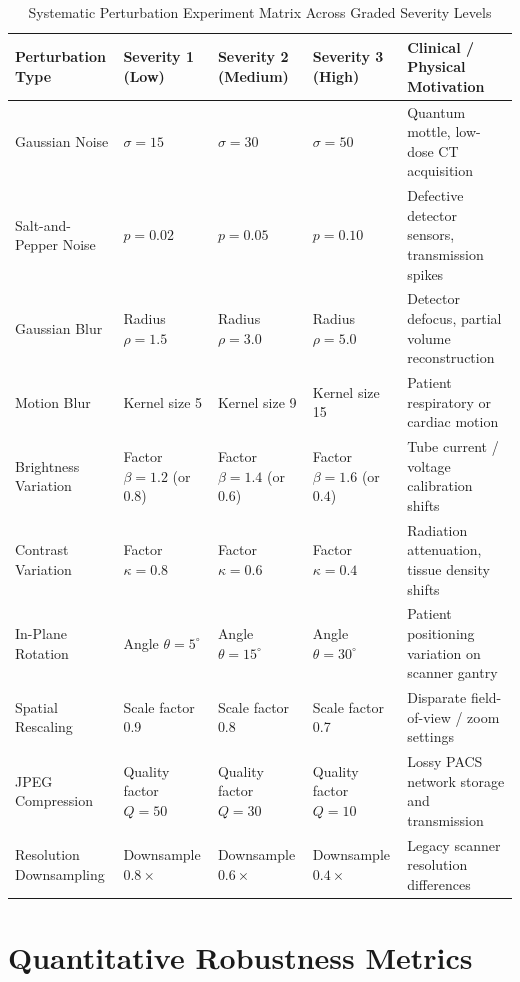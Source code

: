 \documentclass[conference]{IEEEtran}
\begin{document}
\begin{table}[t]
\caption{Systematic Perturbation Experiment Matrix Across Graded Severity Levels}
\label{tab:perturbation_matrix}
\centering
\begin{tabular}{lp{3.5cm}p{3.5cm}p{3.5cm}p{3.5cm}}
\toprule
\textbf{Perturbation Type} & \textbf{Severity 1 (Low)} & \textbf{Severity 2 (Medium)} & \textbf{Severity 3 (High)} & \textbf{Clinical / Physical Motivation} \\
\midrule
Gaussian Noise & $\sigma = 15$ & $\sigma = 30$ & $\sigma = 50$ & Quantum mottle, low-dose CT acquisition \\
Salt-and-Pepper Noise & $p = 0.02$ & $p = 0.05$ & $p = 0.10$ & Defective detector sensors, transmission spikes \\
Gaussian Blur & Radius $\rho = 1.5$ & Radius $\rho = 3.0$ & Radius $\rho = 5.0$ & Detector defocus, partial volume reconstruction \\
Motion Blur & Kernel size 5 & Kernel size 9 & Kernel size 15 & Patient respiratory or cardiac motion \\
Brightness Variation & Factor $\beta = 1.2$ (or $0.8$) & Factor $\beta = 1.4$ (or $0.6$) & Factor $\beta = 1.6$ (or $0.4$) & Tube current / voltage calibration shifts \\
Contrast Variation & Factor $\kappa = 0.8$ & Factor $\kappa = 0.6$ & Factor $\kappa = 0.4$ & Radiation attenuation, tissue density shifts \\
In-Plane Rotation & Angle $\theta = 5^\circ$ & Angle $\theta = 15^\circ$ & Angle $\theta = 30^\circ$ & Patient positioning variation on scanner gantry \\
Spatial Rescaling & Scale factor 0.9 & Scale factor 0.8 & Scale factor 0.7 & Disparate field-of-view / zoom settings \\
JPEG Compression & Quality factor $Q = 50$ & Quality factor $Q = 30$ & Quality factor $Q = 10$ & Lossy PACS network storage and transmission \\
Resolution Downsampling & Downsample $0.8\times$ & Downsample $0.6\times$ & Downsample $0.4\times$ & Legacy scanner resolution differences \\
\bottomrule
\end{tabular}
\end{table}

\section{Quantitative Robustness Metrics}
\label{sec:robustness_metrics}
\end{document}
